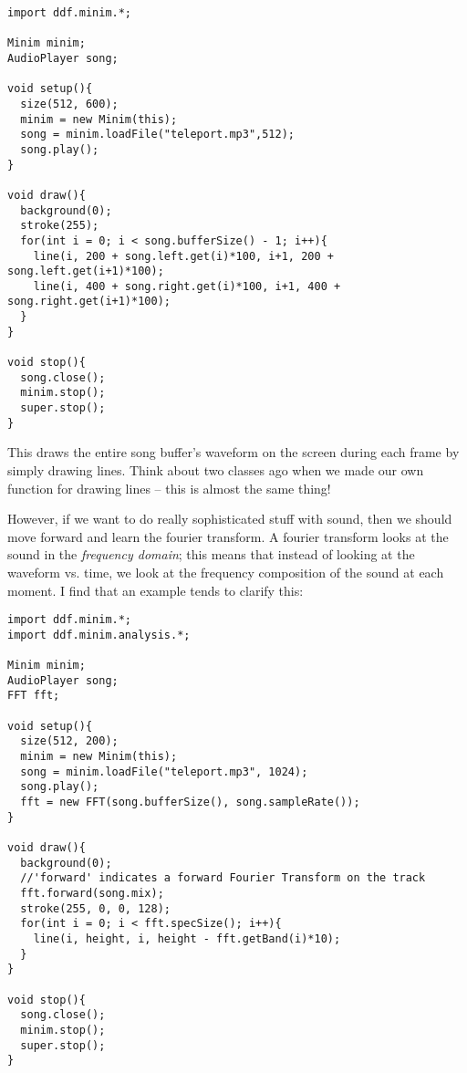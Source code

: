 \begin{verbatim}
import ddf.minim.*;
 
Minim minim;
AudioPlayer song;
 
void setup(){
  size(512, 600);
  minim = new Minim(this);
  song = minim.loadFile("teleport.mp3",512);
  song.play();
}

void draw(){
  background(0);
  stroke(255);
  for(int i = 0; i < song.bufferSize() - 1; i++){
    line(i, 200 + song.left.get(i)*100, i+1, 200 + song.left.get(i+1)*100);
    line(i, 400 + song.right.get(i)*100, i+1, 400 + song.right.get(i+1)*100);
  }
}
 
void stop(){
  song.close();
  minim.stop();
  super.stop();
}
\end{verbatim}

This draws the entire song buffer's waveform on the screen during each frame by simply drawing lines.  Think about two classes ago when we made our own function for drawing lines -- this is almost the same thing!

However, if we want to do really sophisticated stuff with sound, then we should move forward and learn the fourier transform.  A fourier transform looks at the sound in the \emph{frequency domain}; this means that instead of looking at the waveform vs. time, we look at the frequency composition of the sound at each moment.  I find that an example tends to clarify this:

\begin{verbatim}
import ddf.minim.*;
import ddf.minim.analysis.*;
 
Minim minim;
AudioPlayer song;
FFT fft;
 
void setup(){
  size(512, 200);
  minim = new Minim(this);
  song = minim.loadFile("teleport.mp3", 1024);
  song.play();
  fft = new FFT(song.bufferSize(), song.sampleRate());
}
 
void draw(){
  background(0);
  //'forward' indicates a forward Fourier Transform on the track
  fft.forward(song.mix);
  stroke(255, 0, 0, 128);
  for(int i = 0; i < fft.specSize(); i++){
    line(i, height, i, height - fft.getBand(i)*10);
  }
}
 
void stop(){
  song.close();
  minim.stop();
  super.stop();
}
\end{verbatim}

